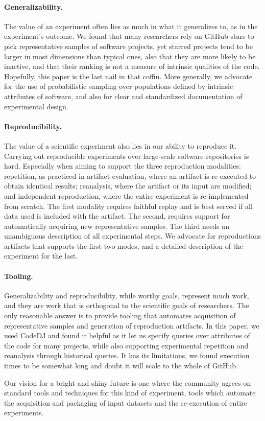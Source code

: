 \documentclass[sigconf,review,anonymous]{acmart}
\newcommand{\gh}{{GitHub}\xspace}
\renewcommand{\dj}{{\textsf{Code{\small{DJ}}}}\xspace}
\begin{document}
\paragraph{Generalizability.} The value of an experiment often lies as much
in what it generalizes to, as in the experiment's outcome. We found that many
researchers rely on \gh stars to pick representative samples of software
projects, yet starred projects tend to be larger in most dimensions than typical
ones, also that they are more likely to be inactive, and that their ranking is
not a measure of intrinsic qualities of the code. Hopefully, this paper is the
last nail in that coffin. More generally, we advocate for the use of
probabilistic sampling over populations defined by intrinsic attributes of
software, and also for clear and standardized documentation of experimental
design.

\paragraph{Reproducibility.}
The value of a scientific experiment also lies in our ability to reproduce it.
Carrying out reproducible experiments over large-scale software repositories is
hard. Especially when aiming to support the three reproduction modalities:
repetition, as practiced in artifact evaluation, where an artifact is
re-executed to obtain identical results; reanalysis, where the artifact or its
input are modified; and independent reproduction, where the entire experiment is
re-implemented from scratch. The first modality requires faithful replay and is
best served if all data used is included with the artifact. The second, requires
support for automatically acquiring new representative samples. The third needs
an unambiguous description of all experimental steps. We advocate for
reproductions artifacts that supports the first two modes, and a detailed
description of the experiment for the last.

\paragraph{Tooling.}
Generalizability and reproducibility, while worthy goals, represent much work,
and they are work that is orthogonal to the scientific goals of researchers. The
only reasonable answer is to provide tooling that automates acquisition of
representative samples and generation of reproduction artifacts. In this paper,
we used \dj and found it helpful as it let us specify queries over attributes of
the code for many projects, while also supporting experimental repetition and
reanalysis through historical queries. It has its limitations, we found
execution times to be somewhat long and doubt it will scale to the whole of \gh.

\medskip

Our vision for a bright and shiny future is one where the community agrees on
standard tools and techniques for this kind of experiment, tools which automate
the acquisition and packaging of input datasets and the re-execution of entire
experiments.

 
\end{document}
